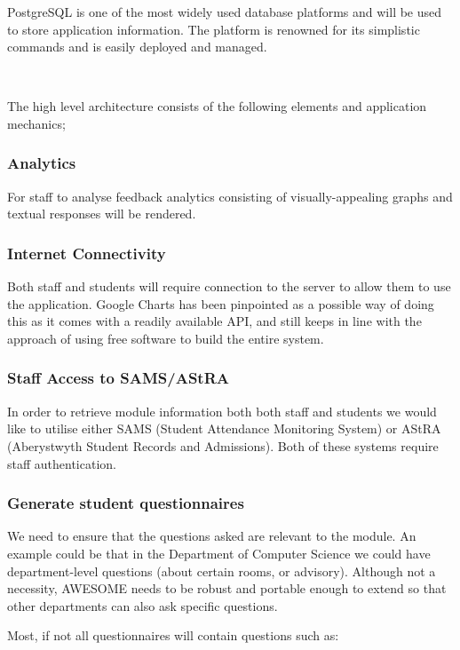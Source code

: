 \documentclass[11pt,a4paper]{article}
\begin{document}
PostgreSQL is one of the most widely used database platforms and will be used to store application information. The platform is renowned for its simplistic commands and is easily deployed and managed.

\

The high level architecture consists of the following elements and application mechanics;

\subsubsection{Analytics}

For staff to analyse feedback analytics consisting of visually-appealing graphs and textual responses will be rendered.

\subsubsection{Internet Connectivity}

Both staff and students will require connection to the server to allow them to use the application. Google Charts has been pinpointed as a possible way of doing this as it comes with a readily available API, and still keeps in line with the approach of using free software to build the entire system.

\subsubsection{Staff Access to SAMS/AStRA}

In order to retrieve module information both both staff and students we would like to utilise either SAMS (Student Attendance Monitoring System) or AStRA (Aberystwyth Student Records and Admissions). Both of these systems require staff authentication.

\subsubsection{Generate student questionnaires}

We need to ensure that the questions asked are relevant to the module. An example could be that in the Department of Computer Science we could have department-level questions (about certain rooms, or advisory). Although not a necessity, AWESOME needs to be robust and portable enough to extend so that other departments can also ask specific questions.

Most, if not all questionnaires will contain questions such as:
\end{document}
